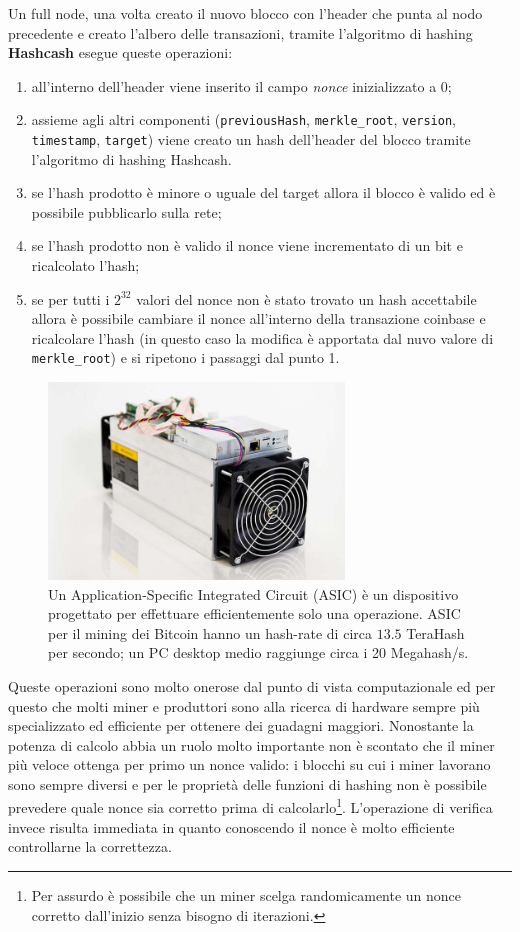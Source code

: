 \begin{enumerate}[1.]
Un full node, una volta creato il nuovo blocco con l'header che punta al nodo precedente e creato l'albero delle transazioni, tramite l'algoritmo di hashing \textbf{Hashcash} esegue queste operazioni:
\begin{enumerate}
    \item all'interno dell'header viene inserito il campo \textit{nonce} inizializzato a 0;
    \item assieme agli altri componenti (\texttt{previousHash}, \texttt{merkle\_root}, \texttt{version}, \texttt{timestamp}, \texttt{target}) viene creato un hash dell'header del blocco tramite l'algoritmo di hashing Hashcash.
    \item se l'hash prodotto è minore o uguale del target allora il blocco è valido ed è possibile pubblicarlo sulla rete;
    \item se l'hash prodotto non è valido il nonce viene incrementato di un bit e ricalcolato l'hash;
    \item se per tutti i $2^{32}$ valori del nonce non è stato trovato un hash accettabile allora è possibile cambiare il nonce all'interno della transazione coinbase e ricalcolare l'hash (in questo caso la modifica è apportata dal nuvo valore di \texttt{merkle\_root}) e si ripetono i passaggi dal punto 1.
\end{enumerate}
\begin{figure}[H]
    \centering
    \includegraphics[width=0.7\textwidth]{images/asic.jpg}
    \caption{Un Application-Specific Integrated Circuit (ASIC) è un dispositivo progettato per effettuare efficientemente solo una operazione. ASIC per il mining dei Bitcoin hanno un hash-rate di circa $13.5$ TeraHash per secondo; un PC desktop medio raggiunge circa i 20 Megahash/s.}
\end{figure}
Queste operazioni sono molto onerose dal punto di vista computazionale ed per questo che molti miner e produttori sono alla ricerca di hardware sempre più specializzato ed efficiente per ottenere dei guadagni maggiori. Nonostante la potenza di calcolo abbia un ruolo molto importante non è scontato che il miner più veloce ottenga per primo un nonce valido: i blocchi su cui i miner lavorano sono sempre diversi e per le proprietà delle funzioni di hashing non è possibile prevedere quale nonce sia corretto prima di calcolarlo\footnote{Per assurdo è possibile che un miner scelga randomicamente un nonce corretto dall'inizio senza bisogno di iterazioni.}. L'operazione di verifica invece risulta immediata in quanto conoscendo il nonce è molto efficiente controllarne la correttezza.\newline

\end{enumerate}
